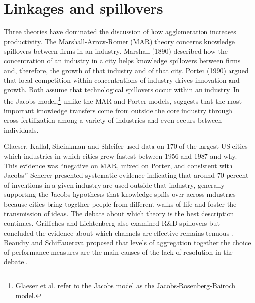 \section{Linkages and spillovers}
Three theories have dominated the discussion of how agglomeration increases productivity. The Marshall-Arrow-Romer (MAR) theory concerns knowledge spillovers between firms in an industry.  Marshall (1890) described how the concentration of an industry in a city helps knowledge
spillovers between firms and, therefore, the growth of that industry and of that city. Porter (1990) argued that local competition within concentrations of industry drives innovation and growth. Both assume that technological spillovers occur within an industry. In the Jacobs model,\footnote{Glaeser et al. \cite{glaeserGrowthCities1991} refer to the Jacobs model as the Jacobs-Rosenberg\cite{rosenbergTechnologicalChangeMachine1963}-Bairoch \cite{bairochCitiesEconomicDevelopment1988} model.} unlike the MAR and Porter models, suggests that the most important knowledge transfers come from outside the core industry through cross-fertilization among a variety  of  industries and even occurs between individuals. 


Glaeser, Kallal, Sheinkman and Shleifer \cite{glaeserGrowthCities1991} used data on 170 of the largest US cities which industries in which cities grew fastest between 1956 and 1987 and why. %
This evidence was ``negative on MAR, mixed on Porter, and consistent with Jacobs.'' Scherer \cite{schererInterindustryTechnologyFlows1982} presented systematic evidence indicating that around 70 percent of inventions in a given industry are used outside that industry, generally supporting the Jacobs hypothesis that knowledge spills over across industries because cities bring together people from different walks of life and foster the transmission of ideas. The debate about which theory is the best description  continues. Grilliches and Lichtenberg also examined R\&D spillovers but concluded the evidence about which channels are effective remains tenuous \cite{grilichesInterindustryTechnologyFlows1984}. Beaudry and Schiffauerova proposed that levels of  aggregation together the choice of performance measures are the main causes of the lack of resolution in the debate  \cite{beaudryWhoRightMarshall2009}.


